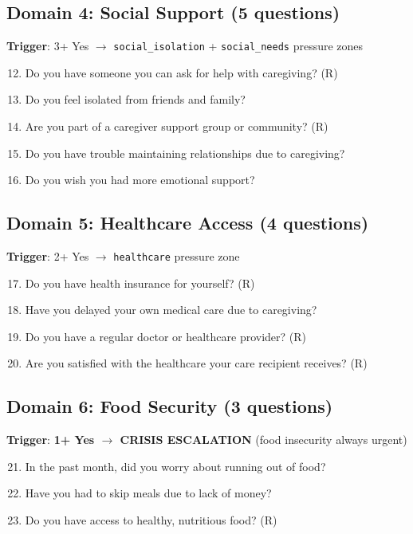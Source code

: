 \documentclass{article}%
\begin{document}
\subsection*{Domain 4: Social Support (5 questions)}
\textbf{Trigger}: 3+ Yes $\rightarrow$ \texttt{social\_isolation} + \texttt{social\_needs} pressure zones

\begin{enumerate}
    \setcounter{enumi}{11}
    \item Do you have someone you can ask for help with caregiving? (R)
    \item Do you feel isolated from friends and family?
    \item Are you part of a caregiver support group or community? (R)
    \item Do you have trouble maintaining relationships due to caregiving?
    \item Do you wish you had more emotional support?
\end{enumerate}

\subsection*{Domain 5: Healthcare Access (4 questions)}
\textbf{Trigger}: 2+ Yes $\rightarrow$ \texttt{healthcare} pressure zone

\begin{enumerate}
    \setcounter{enumi}{16}
    \item Do you have health insurance for yourself? (R)
    \item Have you delayed your own medical care due to caregiving?
    \item Do you have a regular doctor or healthcare provider? (R)
    \item Are you satisfied with the healthcare your care recipient receives? (R)
\end{enumerate}

\subsection*{Domain 6: Food Security (3 questions)}
\textbf{Trigger}: \textbf{1+ Yes $\rightarrow$ CRISIS ESCALATION} (food insecurity always urgent)

\begin{enumerate}
    \setcounter{enumi}{20}
    \item In the past month, did you worry about running out of food?
    \item Have you had to skip meals due to lack of money?
    \item Do you have access to healthy, nutritious food? (R)
\end{enumerate}
\end{document}
